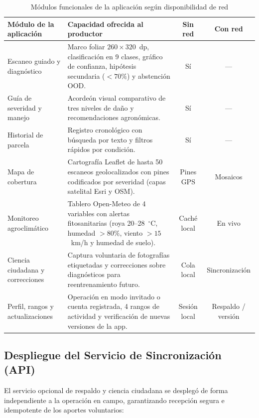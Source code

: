 \begin{table}[H]
\caption{M\'odulos funcionales de la aplicaci\'on seg\'un disponibilidad de red}
\label{tab:capacidades_movil_c4}
\centering
\footnotesize
\begin{singlespace}
\renewcommand{\arraystretch}{1.12}
\begin{tabularx}{\textwidth}{@{}>{\raggedright\arraybackslash}p{3.2cm}>{\raggedright\arraybackslash}Xcc@{}}
\toprule
\textbf{M\'odulo de la aplicaci\'on} & \textbf{Capacidad ofrecida al productor} & \textbf{Sin red} & \textbf{Con red} \\
\midrule
Escaneo guiado y diagn\'ostico & Marco foliar $260\times320$~dp, clasificaci\'on en 9 clases, gr\'afico de confianza, hip\'otesis secundaria ($<70\%$) y abstenci\'on OOD. & S\'i & --- \\
Gu\'ia de severidad y manejo & Acorde\'on visual comparativo de tres niveles de da\~no y recomendaciones agron\'omicas. & S\'i & --- \\
Historial de parcela & Registro cronol\'ogico con b\'usqueda por texto y filtros r\'apidos por condici\'on. & S\'i & --- \\
Mapa de cobertura & Cartograf\'ia Leaflet de hasta 50 escaneos geolocalizados con pines codificados por severidad (capas satelital Esri y OSM). & Pines GPS & Mosaicos \\
Monitoreo agroclim\'atico & Tablero Open-Meteo de 4 variables con alertas fitosanitarias (roya 20--28~$^\circ$C, humedad $>80\%$, viento $>15$~km/h y humedad de suelo). & Cach\'e local & En vivo \\
Ciencia ciudadana y correcciones & Captura voluntaria de fotograf\'ias etiquetadas y correcciones sobre diagn\'osticos para reentrenamiento futuro. & Cola local & Sincronizaci\'on \\
Perfil, rangos y actualizaciones & Operaci\'on en modo invitado o cuenta registrada, 4 rangos de actividad y verificaci\'on de nuevas versiones de la app. & Sesi\'on local & Respaldo / versi\'on \\
\bottomrule
\end{tabularx}
\end{singlespace}
\end{table}

\subsection{Despliegue del Servicio de Sincronizaci\'on (API)}
El servicio opcional de respaldo y ciencia ciudadana se despleg\'o de forma independiente a la operaci\'on en campo, garantizando recepci\'on segura e idempotente de los aportes voluntarios:

